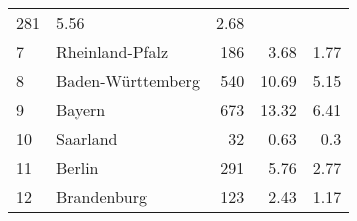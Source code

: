 \begin{longtable}{lXrrr}
       \num{281} &
       \num[round-mode=places,round-precision=2]{5.56} &
         \num[round-mode=places,round-precision=2]{2.68} \\

     7 &
     \multicolumn{1}{X}{ Rheinland-Pfalz   } &


       \num{186} &
       \num[round-mode=places,round-precision=2]{3.68} &
         \num[round-mode=places,round-precision=2]{1.77} \\

     8 &
     \multicolumn{1}{X}{ Baden-Württemberg   } &


       \num{540} &
       \num[round-mode=places,round-precision=2]{10.69} &
         \num[round-mode=places,round-precision=2]{5.15} \\

     9 &
     \multicolumn{1}{X}{ Bayern   } &


       \num{673} &
       \num[round-mode=places,round-precision=2]{13.32} &
         \num[round-mode=places,round-precision=2]{6.41} \\

     10 &
     \multicolumn{1}{X}{ Saarland   } &


       \num{32} &
       \num[round-mode=places,round-precision=2]{0.63} &
         \num[round-mode=places,round-precision=2]{0.3} \\

     11 &
     \multicolumn{1}{X}{ Berlin   } &


       \num{291} &
       \num[round-mode=places,round-precision=2]{5.76} &
         \num[round-mode=places,round-precision=2]{2.77} \\

     12 &
     \multicolumn{1}{X}{ Brandenburg   } &


       \num{123} &
       \num[round-mode=places,round-precision=2]{2.43} &
         \num[round-mode=places,round-precision=2]{1.17} \\


\end{longtable}
